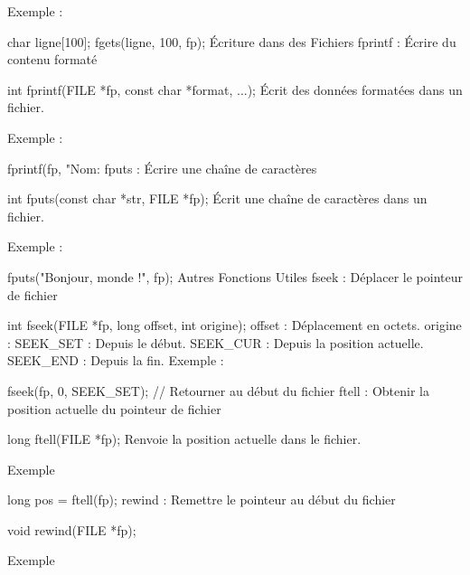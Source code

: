 \begin{DoxyItemize}
\item Exemple \+:
\end{DoxyItemize}


\begin{DoxyCode}
char ligne[100];
fgets(ligne, 100, fp);
Écriture dans des Fichiers
fprintf : Écrire du contenu formaté

int fprintf(FILE *fp, const char *format, ...);
Écrit des données formatées dans un fichier.
\end{DoxyCode}

\begin{DoxyItemize}
\item Exemple \+:
\end{DoxyItemize}


\begin{DoxyCode}
fprintf(fp, "Nom: %
fputs : Écrire une chaîne de caractères

int fputs(const char *str, FILE *fp);
Écrit une chaîne de caractères dans un fichier.
\end{DoxyCode}


Exemple \+:


\begin{DoxyCode}
fputs("Bonjour, monde !", fp);
Autres Fonctions Utiles
fseek : Déplacer le pointeur de fichier

int fseek(FILE *fp, long offset, int origine);
offset : Déplacement en octets.
origine :
SEEK\_SET : Depuis le début.
SEEK\_CUR : Depuis la position actuelle.
SEEK\_END : Depuis la fin.
Exemple :


fseek(fp, 0, SEEK\_SET);  // Retourner au début du fichier
ftell : Obtenir la position actuelle du pointeur de fichier

long ftell(FILE *fp);
Renvoie la position actuelle dans le fichier.
\end{DoxyCode}



\begin{DoxyItemize}
\item Exemple
\end{DoxyItemize}


\begin{DoxyCode}
long pos = ftell(fp);
rewind : Remettre le pointeur au début du fichier

void rewind(FILE *fp);
\end{DoxyCode}

\begin{DoxyItemize}
\item Exemple
\end{DoxyItemize}


